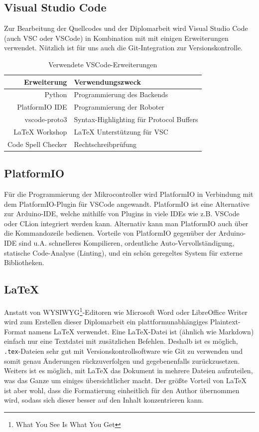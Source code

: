 \subsection{Visual Studio Code}
Zur Bearbeitung der Quellcodes und der Diplomarbeit wird Visual Studio Code (auch VSC oder VSCode)
in Kombination mit mit einigen Erweiterungen verwendet.
%
Nützlich ist für uns auch die Git-Integration zur Versionskontrolle.
\begin{table}[H]
    \centering
    \begin{tabular}{r|l}
        Erweiterung         & Verwendungszweck \\ \hline
        Python              & Programmierung des Backends \\
        PlatformIO IDE      & Programmierung der Roboter \\
        vscode-proto3       & Syntax-Highlighting für Protocol Buffers \\
        LaTeX Workshop      & LaTeX Unterstützung für VSC \\
        Code Spell Checker  & Rechtschreibprüfung \\
    \end{tabular}
    \caption{Verwendete VSCode-Erweiterungen}
    \label{tab:vsc_plugins}
\end{table}
\subsection{PlatformIO}
Für die Programmierung der Mikrocontroller wird PlatformIO \cite{platformio}
in Verbindung mit dem PlatformIO-Plugin für VSCode angewandt.
%
PlatformIO ist eine Alternative zur Arduino-IDE,
welche mithilfe von Plugins in viele IDEs wie z.B. VSCode oder CLion integriert werden kann.
%
Alternativ kann man PlatformIO auch über die Kommandozeile bedienen.
%
Vorteile von PlatformIO gegenüber der Arduino-IDE sind u.A. schnelleres Kompilieren,
ordentliche Auto-Vervollständigung,
statische Code-Analyse (Linting),
und ein schön geregeltes System für externe Bibliotheken.

\subsection{\LaTeX}
\label{subsec:latex}
Anstatt von WYSIWYG\footnote{What You See Is What You Get}-Editoren
wie Microsoft Word oder LibreOffice Writer wird zum Erstellen dieser Diplomarbeit
ein plattformunabhängiges Plaintext-Format namens \LaTeX \cite{latex} verwendet.
Eine LaTeX-Datei ist (ähnlich wie Markdown) einfach nur eine Textdatei mit zusätzlichen Befehlen.
Deshalb ist es möglich, \texttt{.tex}-Dateien sehr gut mit Versionskontrollsoftware wie Git zu verwenden
und somit genau Änderungen rückzuverfolgen und gegebenenfalls zurückzusetzen.
%
Weiters ist es möglich, mit LaTeX das Dokument in mehrere Dateien aufzuteilen,
was das Ganze um einiges übersichtlicher macht.
%
Der größte Vorteil von LaTeX ist aber wohl,
dass die Formatierung einheitlich für den Author übernommen wird,
sodass sich dieser besser auf den Inhalt konzentrieren kann.

